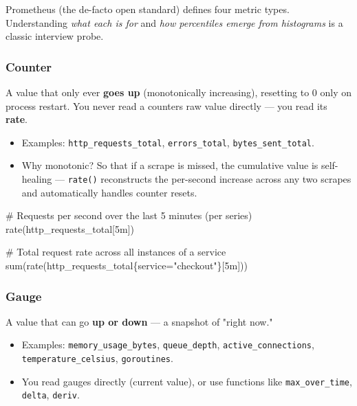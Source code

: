 \documentclass[11pt]{article}
\providecommand{\tightlist}{\setlength{\itemsep}{1pt}\setlength{\parskip}{0pt}}
\newenvironment{Shaded}{\begin{snugshade}}{\end{snugshade}}
\newcommand{\NormalTok}[1]{\textcolor[rgb]{0.81,0.81,0.76}{#1}}
\begin{document}
Prometheus (the de-facto open standard) defines four metric types. Understanding \emph{what each is for} and \emph{how percentiles emerge from histograms} is a classic interview probe.

\subsubsection{Counter}\label{counter}

A value that only ever \textbf{goes up} (monotonically increasing), resetting to 0 only on process restart. You never read a counter\textquotesingle s raw value directly --- you read its \textbf{rate}.

\begin{itemize}
\tightlist
\item
  Examples: \texttt{http\_requests\_total}, \texttt{errors\_total}, \texttt{bytes\_sent\_total}.
\item
  Why monotonic? So that if a scrape is missed, the cumulative value is self-healing --- \texttt{rate()} reconstructs the per-second increase across any two scrapes and automatically handles counter resets.
\end{itemize}


\begin{Shaded}
\begin{Highlighting}[]
\NormalTok{\# Requests per second over the last 5 minutes (per series)}
\NormalTok{rate(http\_requests\_total[5m])}

\NormalTok{\# Total request rate across all instances of a service}
\NormalTok{sum(rate(http\_requests\_total\{service="checkout"\}[5m]))}
\end{Highlighting}
\end{Shaded}

\subsubsection{Gauge}\label{gauge}

A value that can go \textbf{up or down} --- a snapshot of "right now."

\begin{itemize}
\tightlist
\item
  Examples: \texttt{memory\_usage\_bytes}, \texttt{queue\_depth}, \texttt{active\_connections}, \texttt{temperature\_celsius}, \texttt{goroutines}.
\item
  You read gauges directly (current value), or use functions like \texttt{max\_over\_time}, \texttt{delta}, \texttt{deriv}.
\end{itemize}
\end{document}
